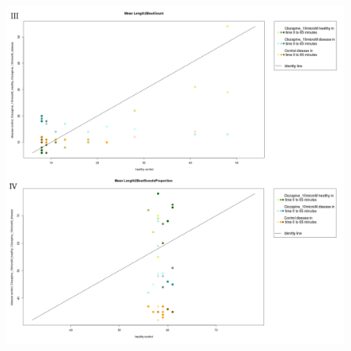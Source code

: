 \documentclass[a4paper,12pt]{article}
\begin{document}
\begin{figure}[h!]
\begin{center}
\includegraphics[width=15cm,height=17cm]{PTZCountScootsC.png}
\end{center}
\end{figure}
\newpage
\end{document}
